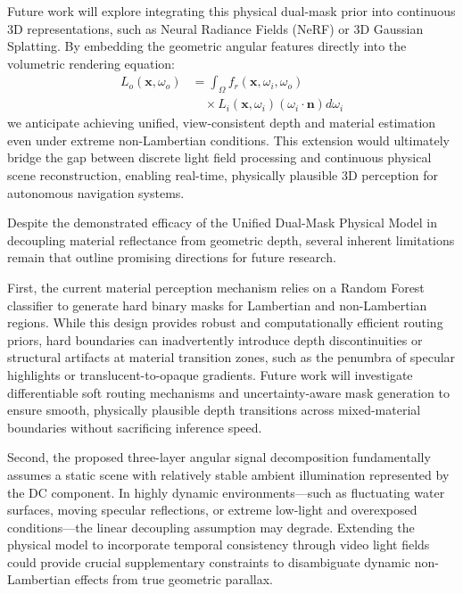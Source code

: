 \documentclass[lettersize,journal]{IEEEtran}
\begin{document}
Future work will explore integrating this physical dual-mask prior into continuous 3D representations, such as Neural Radiance Fields (NeRF) or 3D Gaussian Splatting. By embedding the geometric angular features directly into the volumetric rendering equation:
\begin{equation}
\begin{aligned}
L_o(\mathbf{x}, \omega_o) &= \int_{\Omega} f_r(\mathbf{x}, \omega_i, \omega_o) \\
&\quad \times L_i(\mathbf{x}, \omega_i) (\omega_i \cdot \mathbf{n}) d\omega_i
\end{aligned}
\end{equation}
we anticipate achieving unified, view-consistent depth and material estimation even under extreme non-Lambertian conditions. This extension would ultimately bridge the gap between discrete light field processing and continuous physical scene reconstruction, enabling real-time, physically plausible 3D perception for autonomous navigation systems.

Despite the demonstrated efficacy of the Unified Dual-Mask Physical Model in decoupling material reflectance from geometric depth, several inherent limitations remain that outline promising directions for future research. 

First, the current material perception mechanism relies on a Random Forest classifier to generate hard binary masks for Lambertian and non-Lambertian regions. While this design provides robust and computationally efficient routing priors, hard boundaries can inadvertently introduce depth discontinuities or structural artifacts at material transition zones, such as the penumbra of specular highlights or translucent-to-opaque gradients. Future work will investigate differentiable soft routing mechanisms and uncertainty-aware mask generation to ensure smooth, physically plausible depth transitions across mixed-material boundaries without sacrificing inference speed.

Second, the proposed three-layer angular signal decomposition fundamentally assumes a static scene with relatively stable ambient illumination represented by the DC component. In highly dynamic environments---such as fluctuating water surfaces, moving specular reflections, or extreme low-light and overexposed conditions---the linear decoupling assumption may degrade. Extending the physical model to incorporate temporal consistency through video light fields could provide crucial supplementary constraints to disambiguate dynamic non-Lambertian effects from true geometric parallax.
\end{document}
